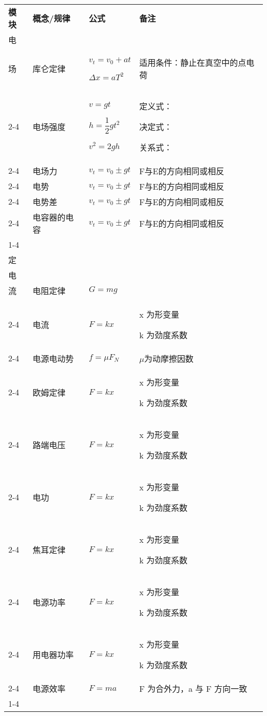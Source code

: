 \begin{longtable}[]{@{}|m{1.07cm}|m{2.43cm}|m{4cm}|m{5.5cm}|@{}}
	\hline
	\textbf{模块} & \textbf{概念/规律} & \textbf{公式 } & \textbf{备注}\endhead
	\hline
	\multirow{7}{1cm}{静\\
	电\\
	场}
	&
	库仑定律&
	$v_t=v_0+at$

	$\Delta x=aT^2$
    &
	适用条件：静止在真空中的点电荷\tabularnewline
	\cline{2-4}
	&电场强度&
	$v=gt$

	$h=\dfrac{1}{2}gt^2$

	$v^2=2gh$&
    定义式：
    
    决定式：

    关系式：
	\tabularnewline
	\cline{2-4}
	&电场力&
	$v_t=v_0\pm gt$
	&
	F与E的方向相同或相反\tabularnewline
    \cline{2-4}		
    &电势&
	$v_t=v_0\pm gt$
	&
	F与E的方向相同或相反\tabularnewline
    \cline{2-4}		
    &电势差&
	$v_t=v_0\pm gt$
	&
	F与E的方向相同或相反\tabularnewline
    \cline{2-4}	
    &电容器的电容&
	$v_t=v_0\pm gt$
	&
	F与E的方向相同或相反\tabularnewline
	\cline{1-4}
	\multirow{10}{1cm}{恒\\
	定\\
	电\\
	流}
	&
	电阻定律&$G=mg$&\tabularnewline
	\cline{2-4}
	&电流&$F=kx$&x 为形变量

	k 为劲度系数\tabularnewline
	\cline{2-4}
	&电源电动势&$f=\mu F_N$&$\mu$为动摩擦因数\tabularnewline
    \cline{2-4}
	&欧姆定律&$F=kx$&x 为形变量

	k 为劲度系数\tabularnewline
	\cline{2-4}
	&路端电压&$F=kx$&x 为形变量

	k 为劲度系数\tabularnewline
	\cline{2-4}
	&电功&$F=kx$&x 为形变量

	k 为劲度系数\tabularnewline
	\cline{2-4}
	&焦耳定律&$F=kx$&x 为形变量

	k 为劲度系数\tabularnewline
	\cline{2-4}
	&电源功率&$F=kx$&x 为形变量

	k 为劲度系数\tabularnewline
	\cline{2-4}
	&用电器功率&$F=kx$&x 为形变量

	k 为劲度系数\tabularnewline
	\cline{2-4}
	&电源效率&$F=ma$&F 为合外力，a 与 F 方向一致\tabularnewline
	\cline{1-4}

\end{longtable}
